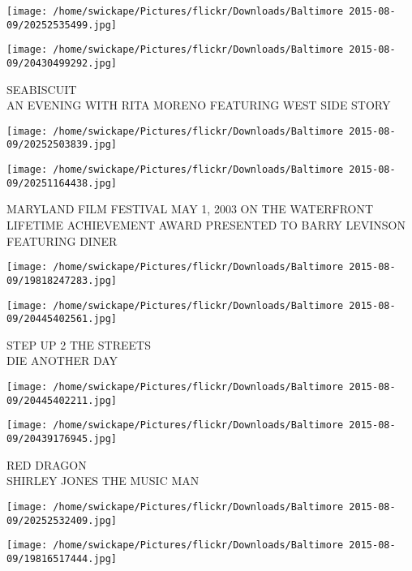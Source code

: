 \documentclass[10pt,letterpaper]{article}
\begin{document}
\texttt{[image: /home/swickape/Pictures/flickr/Downloads/Baltimore 2015-08-09/20252535499.jpg]}

\vspace{0.25in}
\texttt{[image: /home/swickape/Pictures/flickr/Downloads/Baltimore 2015-08-09/20430499292.jpg]}

SEABISCUIT\\
AN EVENING WITH RITA MORENO FEATURING WEST SIDE STORY\\
\pagebreak

\texttt{[image: /home/swickape/Pictures/flickr/Downloads/Baltimore 2015-08-09/20252503839.jpg]}

\vspace{0.25in}
\texttt{[image: /home/swickape/Pictures/flickr/Downloads/Baltimore 2015-08-09/20251164438.jpg]}

MARYLAND FILM FESTIVAL MAY 1, 2003 ON THE WATERFRONT\\
LIFETIME ACHIEVEMENT AWARD PRESENTED TO BARRY LEVINSON FEATURING DINER\\
\pagebreak

\texttt{[image: /home/swickape/Pictures/flickr/Downloads/Baltimore 2015-08-09/19818247283.jpg]}

\vspace{0.25in}
\texttt{[image: /home/swickape/Pictures/flickr/Downloads/Baltimore 2015-08-09/20445402561.jpg]}

STEP UP 2 THE STREETS\\
DIE ANOTHER DAY\\
\pagebreak

\texttt{[image: /home/swickape/Pictures/flickr/Downloads/Baltimore 2015-08-09/20445402211.jpg]}

\vspace{0.25in}
\texttt{[image: /home/swickape/Pictures/flickr/Downloads/Baltimore 2015-08-09/20439176945.jpg]}

RED DRAGON\\
SHIRLEY JONES THE MUSIC MAN\\
\pagebreak

\texttt{[image: /home/swickape/Pictures/flickr/Downloads/Baltimore 2015-08-09/20252532409.jpg]}

\vspace{0.25in}
\texttt{[image: /home/swickape/Pictures/flickr/Downloads/Baltimore 2015-08-09/19816517444.jpg]}
\end{document}
